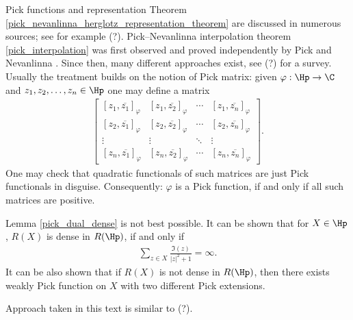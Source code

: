 Pick functions and representation Theorem \ref{pick_nevanlinna_herglotz_representation_theorem} are discussed in numerous sources; see for example (?). Pick--Nevanlinna interpolation theorem \ref{pick_interpolation} was first observed and proved independently by Pick \cite{Pick} and Nevanlinna \cite{Nevan}. Since then, many different approaches exist, see (?) for a survey. Usually the treatment builds on the notion of Pick matrix: given $\varphi : \Hp \to \C$ and $z_{1}, z_{2}, \ldots, z_{n} \in \Hp$ one may define a matrix
\begin{align*}
	\begin{bmatrix}
		[z_{1}, \overline{z_{1}}]_{\varphi} & [z_{1}, \overline{z_{2}}]_{\varphi} & \cdots & [z_{1}, \overline{z_{n}}]_{\varphi} \\
		[z_{2}, \overline{z_{1}}]_{\varphi} & [z_{2}, \overline{z_{2}}]_{\varphi} & \cdots & [z_{2}, \overline{z_{n}}]_{\varphi} \\
		\vdots & \vdots & \ddots & \vdots \\
		[z_{n}, \overline{z_{1}}]_{\varphi} & [z_{n}, \overline{z_{2}}]_{\varphi} & \cdots &  [z_{n}, \overline{z_{n}}]_{\varphi}
	\end{bmatrix}.
\end{align*}
One may check that quadratic functionals of such matrices are just Pick functionals in disguise. Consequently: $\varphi$ is a Pick function, if and only if all such matrices are positive.

Lemma \ref{pick_dual_dense} is not best possible. It can be shown that for $X \in \Hp$, $R(X)$ is dense in $R(\Hp)$, if and only if
\begin{align*}
	\sum_{z \in X} \frac{\Im(z)}{|z|^2 + 1} = \infty.
\end{align*}
It can be also shown that if $R(X)$ is not dense in $R(\Hp)$, then there exists weakly Pick function on $X$ with two different Pick extensions.

Approach taken in this text is similar to (?).
\begin{comment}

TODO:
\begin{itemize}
	\item Examples of representing measures behind functions and functions behind representing measures
	\item Spectral commutant lifting theorem
	\item Use Morera's theorem to prove weak Hindmarsh's theorem
	\item Nice formula for finite Pick extension (rational function case)
\end{itemize}

\end{comment}






